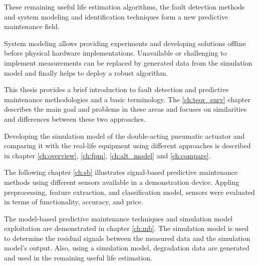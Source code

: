 These remaining useful life estimation algorithms, the fault detection
methods and system modeling and identification techniques form a new
predictive maintenance field.

System modeling allows providing experiments and developing solutions
offline before physical hardware implementations. Unavailable or
challenging to implement measurements can be replaced by generated data
from the simulation model and finally helps to deploy a robust algorithm.

This thesis provides a brief introduction to fault detection and predictive
maintenance methodologies and a basic terminology. 
The \ref{ch:teor_surv} chapter describes the main goal and problems
in these areas and focuses on similarities and differences between these
two approaches.

Developing the simulation model of the double-acting pneumatic actuator and
comparing it with the real-life equipment using different approaches is
described in chapter \ref{ch:overview}, \ref{ch:fpm}, \ref{ch:alt_model}
and \ref{ch:compare}. 

The following chapter \ref{ch:sb} illustrates signal-based predictive
maintenance methods using different sensors available in a demonstration
device.  Appling preprocessing, feature extraction, and classification
model, sensors were evaluated in terms of functionality, accuracy, and
price. 

The model-based predictive maintenance techniques and simulation model
exploitation are demonstrated in chapter \ref{ch:mb}. The simulation model
is used to determine the residual signals between the measured data and the
simulation model's output. Also, using a simulation model, degradation data
are generated and used in the remaining useful life estimation.

